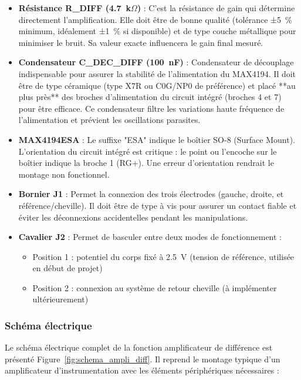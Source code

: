 \documentclass{article}
\begin{document}
\begin{itemize}
    \item \textbf{Résistance R\_DIFF (4.7~k$\Omega$)} : C'est la résistance de gain qui détermine directement l'amplification. Elle doit être de bonne qualité (tolérance ±5~\% minimum, idéalement ±1~\% si disponible) et de type couche métallique pour minimiser le bruit. Sa valeur exacte influencera le gain final mesuré.
    
    \item \textbf{Condensateur C\_DEC\_DIFF (100~nF)} : Condensateur de découplage indispensable pour assurer la stabilité de l'alimentation du MAX4194. Il doit être de type céramique (type X7R ou C0G/NP0 de préférence) et placé **au plus près** des broches d'alimentation du circuit intégré (broches 4 et 7) pour être efficace. Ce condensateur filtre les variations haute fréquence de l'alimentation et prévient les oscillations parasites.
    
    \item \textbf{MAX4194ESA} : Le suffixe "ESA" indique le boîtier SO-8 (Surface Mount). L'orientation du circuit intégré est critique : le point ou l'encoche sur le boîtier indique la broche 1 (RG+). Une erreur d'orientation rendrait le montage non fonctionnel.
    
    \item \textbf{Bornier J1} : Permet la connexion des trois électrodes (gauche, droite, et référence/cheville). Il doit être de type à vis pour assurer un contact fiable et éviter les déconnexions accidentelles pendant les manipulations.
    
    \item \textbf{Cavalier J2} : Permet de basculer entre deux modes de fonctionnement :
    \begin{itemize}
        \item Position 1 : potentiel du corps fixé à 2.5~V (tension de référence, utilisée en début de projet)
        \item Position 2 : connexion au système de retour cheville (à implémenter ultérieurement)
    \end{itemize}
\end{itemize}

\subsubsection{Schéma électrique}

Le schéma électrique complet de la fonction amplificateur de différence est présenté Figure~\ref{fig:schema_ampli_diff}. Il reprend le montage typique d'un amplificateur d'instrumentation avec les éléments périphériques nécessaires :
\end{document}
